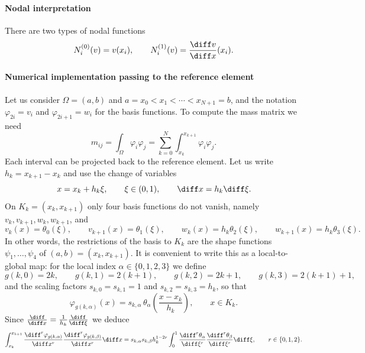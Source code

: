 \paragraph*{Nodal interpretation}
There are two types of nodal functions
\[
    N_{i}^{(0)} (v) = v(x_i), \qquad N_{i}^{(1)} (v) = \frac{\diff v}{\diff x} (x_i).
\]

\paragraph*{Numerical implementation passing to the reference element}
Let us consider $\Omega = (a,b)$ and $a = x_0 < x_1 < \cdots < x_{N+1} = b$, and the notation $\varphi_{2i} = v_i$ and $\varphi_{2i + 1} = w_i$ for the basis functions. To compute the mass matrix we need
\[
    m_{ij} = \int_\Omega \varphi_{i} \varphi_{j} = \sum_{k=0}^N \int_{x_k}^{x_{k+1}} \varphi_{i} \varphi_{j}.
\]
Each interval can be projected back to the reference element.
Let us write $h_k = x_{k+1} - x_k$ and use the change of variables
\begin{equation*}
    x = x_k + h_k \xi, \qquad \xi \in (0,1), \qquad \diff x = h_k \diff \xi.
\end{equation*}
On $K_k = (x_k, x_{k+1})$ only four basis functions do not vanish, namely $v_k, v_{k+1}, w_k, w_{k+1}$, and
\begin{equation*}
    v_k (x) = \theta_0 (\xi), \qquad v_{k+1} (x) = \theta_1 (\xi), \qquad w_k (x) = h_k \theta_2 (\xi), \qquad w_{k+1} (x) = h_k \theta_3 (\xi).
\end{equation*}
In other words, the restrictions of the basis to $K_k$ are the shape functions $\psi_1, \dots, \psi_4$ of $(a,b) = (x_k,x_{k+1})$.
It is convenient to write this as a local-to-global map: for the local index $\alpha \in \{0,1,2,3\}$ we define
\begin{equation*}
    g(k,0) = 2k, \qquad g(k,1) = 2(k+1), \qquad g(k,2) = 2k+1, \qquad g(k,3) = 2(k+1)+1,
\end{equation*}
and the scaling factors $s_{k,0} = s_{k,1} = 1$ and $s_{k,2} = s_{k,3} = h_k$, so that
\begin{equation*}
    \varphi_{g(k,\alpha)} (x) = s_{k,\alpha} \, \theta_\alpha \left( \frac{x - x_k}{h_k} \right), \qquad x \in K_k.
\end{equation*}
Since $\frac{\diff}{\diff x} = \frac{1}{h_k} \frac{\diff}{\diff \xi}$ we deduce
\begin{equation*}
    \int_{x_k}^{x_{k+1}} \frac{\diff^r \varphi_{g(k,\alpha)}}{\diff x^r} \frac{\diff^r \varphi_{g(k,\beta)}}{\diff x^r} \diff x
    = s_{k,\alpha} s_{k,\beta} h_k^{1-2r} \int_0^1 \frac{\diff^r \theta_\alpha}{\diff \xi^r} \frac{\diff^r \theta_\beta}{\diff \xi^r} \diff \xi,
    \qquad r \in \{0, 1, 2\}.
\end{equation*}

